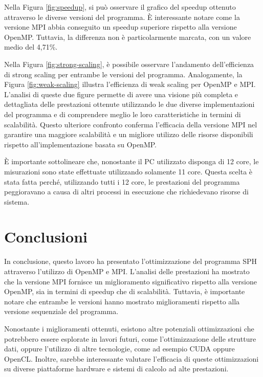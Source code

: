 \documentclass[a4paper,12pt, oneside]{article}
\begin{document}
Nella Figura \ref{fig:speedup}, si può osservare il grafico del speedup ottenuto attraverso
le diverse versioni del programma. È interessante notare come la versione MPI abbia
conseguito un speedup superiore rispetto alla versione OpenMP. Tuttavia, la differenza non
è particolarmente marcata, con un valore medio del 4,71\%.

Nella Figura \ref{fig:strong-scaling}, è possibile osservare l'andamento dell'efficienza di
strong scaling per entrambe le versioni del programma. Analogamente, la Figura \ref{fig:weak-scaling}
illustra l'efficienza di weak scaling per OpenMP e MPI. L'analisi di queste due figure
permette di avere una visione più completa e dettagliata delle prestazioni ottenute
utilizzando le due diverse implementazioni del programma e di comprendere meglio le loro
caratteristiche in termini di scalabilità. Questo ulteriore confronto conferma l'efficacia
della versione MPI nel garantire una maggiore scalabilità e un migliore utilizzo delle
risorse disponibili rispetto all'implementazione basata su OpenMP.

È importante sottolineare che, nonostante il PC utilizzato disponga di 12 core, le
misurazioni sono state effettuate utilizzando solamente 11 core. Questa scelta è stata
fatta perché, utilizzando tutti i 12 core, le prestazioni del programma peggioravano a
causa di altri processi in esecuzione che richiedevano risorse di sistema.

\section{Conclusioni}

In conclusione, questo lavoro ha presentato l'ottimizzazione del programma SPH attraverso
l'utilizzo di OpenMP e MPI. L'analisi delle prestazioni ha mostrato che la versione MPI
fornisce un miglioramento significativo rispetto alla versione OpenMP, sia in termini di
speedup che di scalabilità. Tuttavia, è importante notare che entrambe le
versioni hanno mostrato miglioramenti rispetto alla versione sequenziale del programma.

Nonostante i miglioramenti ottenuti, esistono altre potenziali ottimizzazioni che potrebbero
essere esplorate in lavori futuri, come l'ottimizzazione delle strutture dati, oppure
l'utilizzo di altre tecnologie, come ad esempio CUDA oppure OpenCL. Inoltre, sarebbe
interessante valutare l'efficacia di queste ottimizzazioni su diverse piattaforme hardware
e sistemi di calcolo ad alte prestazioni.
\end{document}

